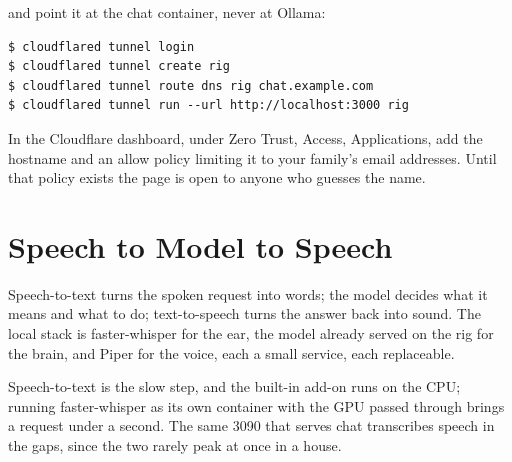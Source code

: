 
 and point it at the chat container, never at
Ollama:

\begin{verbatim}
$ cloudflared tunnel login
$ cloudflared tunnel create rig
$ cloudflared tunnel route dns rig chat.example.com
$ cloudflared tunnel run --url http://localhost:3000 rig
\end{verbatim}

 In the Cloudflare dashboard,
under Zero Trust, Access, Applications, add the hostname and an allow policy
limiting it to your family's email addresses. Until that policy exists the page is
open to anyone who guesses the name.


\section{Speech to Model to Speech}%

 Speech-to-text turns the spoken request
into words; the model decides what it means and what to do; text-to-speech turns
the answer back into sound. The local stack is faster-whisper for the ear, the
model already served on the rig for the brain, and Piper for the voice, each a
small service, each replaceable.


 Speech-to-text is the slow step, and the
built-in add-on runs on the CPU; running faster-whisper as its own container with
the GPU passed through brings a request under a second. The same 3090 that serves
chat transcribes speech in the gaps, since the two rarely peak at once in a house.

